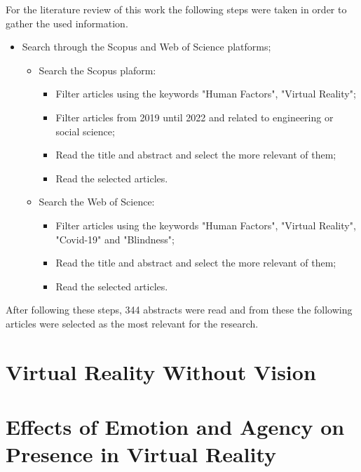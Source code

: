 For the literature review of this work the following steps were taken in order to gather the used information.
\begin{itemize}
    \item Search through the Scopus and Web of Science platforms;
    \begin{itemize}
        \item Search the Scopus plaform:
        \begin{itemize}
            \item Filter articles using the keywords "Human Factors", "Virtual Reality";
            \item Filter articles from 2019 until 2022 and related to engineering or social science;
            \item Read the title and abstract and select the more relevant of them;
            \item Read the selected articles.
        \end{itemize}
        \item Search the Web of Science:
        \begin{itemize}
            \item Filter articles using the keywords "Human Factors", "Virtual Reality", "Covid-19" and "Blindness";
            \item Read the title and abstract and select the more relevant of them;
            \item Read the selected articles.
        \end{itemize}
    \end{itemize}
\end{itemize}

After following these steps, 344 abstracts were read and from these the following articles were selected as the most relevant for the research.

\section{Virtual Reality Without Vision}
\label{sec:vr_without_vision}


\section{Effects of Emotion and Agency on Presence in Virtual Reality}
\label{sec:emotion_presence_vr}


